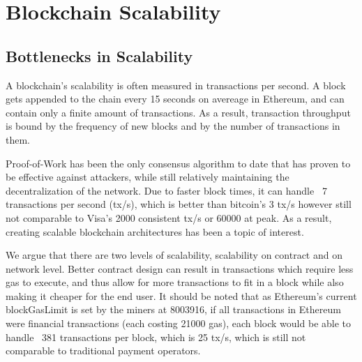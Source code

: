 \chapter{Blockchain Scalability}

\section{Bottlenecks in Scalability}
A blockchain's scalability is often measured in transactions per second. A block gets appended to the chain every 15 seconds on avereage in Ethereum, and can contain only a finite amount of transactions. As a result, transaction throughput is bound by the frequency of new blocks and by the number of transactions in them.

Proof-of-Work has been the only consensus algorithm to date that has proven to be effective against attackers, while still relatively maintaining the decentralization of the network. Due to faster block times, it can handle ~7 transactions per second (tx/s), which is better than bitcoin's 3 tx/s however still not comparable to Visa's 2000 consistent tx/s or 60000 at peak. As a result, creating scalable blockchain architectures has been a topic of interest.

We argue that there are two levels of scalability, scalability on contract and on network level. Better contract design can result in transactions which require less gas to execute, and thus allow for more transactions to fit in a block while also making it cheaper for the end user. It should be noted that as Ethereum's current blockGasLimit is set by the miners at 8003916, if all transactions in Ethereum were financial transactions (each costing 21000 gas), each block would be able to handle ~381 transactions per block, which is 25 tx/s, which is still not comparable to traditional payment operators. 

